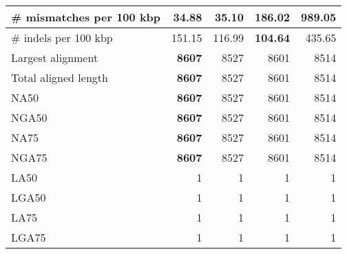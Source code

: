 \documentclass[12pt,a4paper]{article}
\begin{document}
\begin{table}[ht]
\begin{center}
\begin{tabular}{|l*{4}{|r}|}
\# mismatches per 100 kbp & {\bf 34.88} & 35.10 & 186.02 & 989.05 \\ \hline
\# indels per 100 kbp & 151.15 & 116.99 & {\bf 104.64} & 435.65 \\ \hline
Largest alignment & {\bf 8607} & 8527 & 8601 & 8514 \\ \hline
Total aligned length & {\bf 8607} & 8527 & 8601 & 8514 \\ \hline
NA50 & {\bf 8607} & 8527 & 8601 & 8514 \\ \hline
NGA50 & {\bf 8607} & 8527 & 8601 & 8514 \\ \hline
NA75 & {\bf 8607} & 8527 & 8601 & 8514 \\ \hline
NGA75 & {\bf 8607} & 8527 & 8601 & 8514 \\ \hline
LA50 & 1 & 1 & 1 & 1 \\ \hline
LGA50 & 1 & 1 & 1 & 1 \\ \hline
LA75 & 1 & 1 & 1 & 1 \\ \hline
LGA75 & 1 & 1 & 1 & 1 \\ \hline
\end{tabular}
\end{center}
\end{table}
\end{document}
